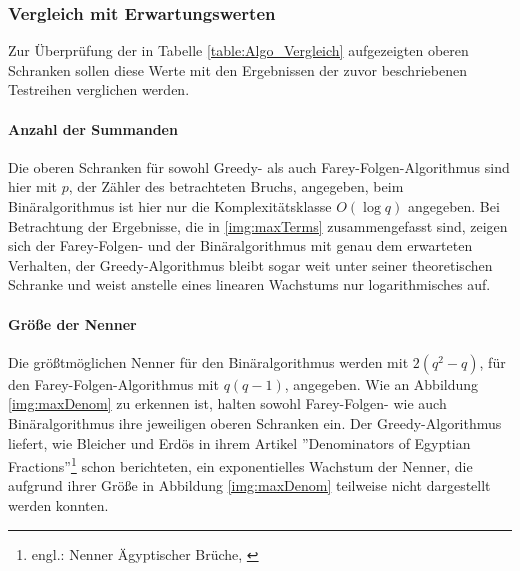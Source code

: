 \subsubsection{Vergleich mit Erwartungswerten}
Zur Überprüfung der in Tabelle \ref{table:Algo_Vergleich} aufgezeigten oberen Schranken sollen diese Werte mit den Ergebnissen der zuvor beschriebenen Testreihen verglichen werden.

\paragraph{Anzahl der Summanden}Die oberen Schranken für sowohl Greedy- als auch Farey-Folgen-Al\-go\-rith\-mus sind hier mit $p$, der Zähler des betrachteten Bruchs, angegeben, beim Binäralgorithmus ist hier nur die Komplexitätsklasse $O(\log q)$ angegeben. Bei Betrachtung der Ergebnisse, die in \ref{img:maxTerms} zusammengefasst sind, zeigen sich der Farey-Folgen- und der Binäralgorithmus mit genau dem erwarteten Verhalten, der Greedy-Algorithmus bleibt sogar weit unter seiner theoretischen Schranke und weist anstelle eines linearen Wachstums nur logarithmisches auf.
\paragraph{Größe der Nenner}Die größtmöglichen Nenner für den Binäralgorithmus werden mit $2(q^2-q)$, für den Farey-Folgen-Algorithmus mit $q(q-1)$, angegeben. Wie an Abbildung \ref{img:maxDenom} zu erkennen ist, halten sowohl Farey-Folgen- wie auch Binäralgorithmus ihre jeweiligen oberen Schranken ein.
Der Greedy-Algorithmus liefert, wie Bleicher und Erdös in ihrem Artikel ''Denominators of Egyptian Fractions''\footnote{engl.: Nenner Ägyptischer Brüche, \cite[S. 157]{BleicherErdoes1976}} schon berichteten, ein exponentielles Wachstum der Nenner, die aufgrund ihrer Größe in Abbildung \ref{img:maxDenom} teilweise nicht dargestellt werden konnten.

